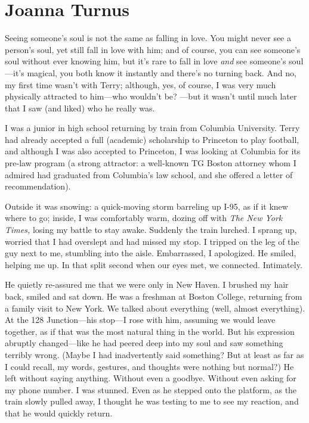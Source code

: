 \chapter{Joanna Turnus}

\titlemark

Seeing someone's soul is not the same as falling in love. You might
never see a person's soul, yet still fall in love with him; and of
course, you can see someone's soul without ever knowing him, but it's
rare to fall in love \emph{and} see someone's soul---it's magical, you
both know it instantly and there's no turning back. And no, my first
time wasn't with Terry; although, yes, of course, I was very much
physically attracted to him---who wouldn't be? ---but it wasn't until
much later that I saw (and liked) who he really was.

I was a junior in high school returning by train from Columbia
University. Terry had already accepted a full (academic) scholarship to
Princeton to play football, and although I was also accepted to
Princeton, I was looking at Columbia for its pre-law program (a strong
attractor: a well-known TG Boston attorney whom I admired had graduated
from Columbia's law school, and she offered a letter of recommendation).

Outside it was snowing: a quick-moving storm barreling up I-95, as if it
knew where to go; inside, I was comfortably warm, dozing off with
\emph{The New York Times,} losing my battle to stay awake. Suddenly the
train lurched. I sprang up, worried that I had overslept and had missed
my stop. I tripped on the leg of the guy next to me, stumbling into the
aisle. Embarrassed, I apologized. He smiled, helping me up. In that
split second when our eyes met, we connected. Intimately.

He quietly re-assured me that we were only in New Haven. I brushed my
hair back, smiled and sat down. He was a freshman at Boston College,
returning from a family visit to New York. We talked about everything
(well, almost everything). At the 128 Junction---his stop---I rose with
him, assuming we would leave together, as if that was the most natural
thing in the world. But his expression abruptly changed---like he had
peered deep into my soul and saw something terribly wrong. (Maybe I had
inadvertently said something? But at least as far as I could recall, my
words, gestures, and thoughts were nothing but normal?) He left without
saying anything. Without even a goodbye. Without even asking for my
phone number. I was stunned. Even as he stepped onto the platform, as
the train slowly pulled away, I thought he was testing to me to see my
reaction, and that he would quickly return.

